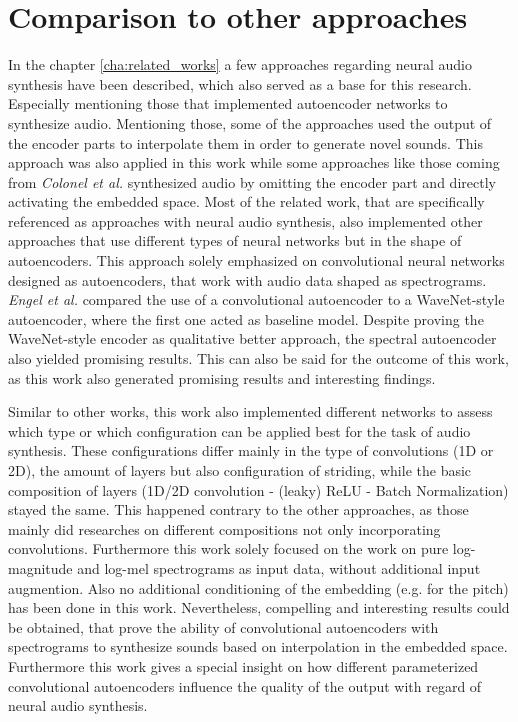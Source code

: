 \section{Comparison to other approaches}
In the chapter \ref{cha:related_works} a few approaches regarding neural audio synthesis have been described, which also served as a base for this research. Especially mentioning those that implemented autoencoder networks to synthesize audio. Mentioning those, some of the approaches used the output of the encoder parts to interpolate them in order to generate novel sounds. This approach was also applied in this work while some approaches like those coming from \textit{Colonel et al.} synthesized audio by omitting the encoder part and directly activating the embedded space. Most of the related work, that are specifically referenced as approaches with neural audio synthesis, also implemented other approaches that use different types of neural networks but in the shape of autoencoders. This approach solely emphasized on convolutional neural networks designed as autoencoders, that work with audio data shaped as spectrograms. \textit{Engel et al.} compared the use of a convolutional autoencoder to a WaveNet-style autoencoder, where the first one acted as baseline model. Despite proving the WaveNet-style encoder as qualitative better approach, the spectral autoencoder also yielded promising results. This can also be said for the outcome of this work, as this work also generated promising results and interesting findings.

Similar to other works, this work also implemented different networks to assess which type or which configuration can be applied best for the task of audio synthesis. These configurations differ mainly in the type of convolutions (1D or 2D), the amount of layers but also configuration of striding, while the basic composition of layers (1D/2D convolution - (leaky) ReLU - Batch Normalization) stayed the same. This happened contrary to the other approaches, as those mainly did researches on different compositions not only incorporating convolutions. Furthermore this work solely focused on the work on pure log-magnitude and log-mel spectrograms as input data, without additional input augmention. Also no additional conditioning of the embedding (e.g. for the pitch) has been done in this work. Nevertheless, compelling and interesting results could be obtained, that prove the ability of convolutional autoencoders with spectrograms to synthesize sounds based on interpolation in the embedded space. Furthermore this work gives a special insight on how different parameterized convolutional autoencoders influence the quality of the output with regard of neural audio synthesis.



